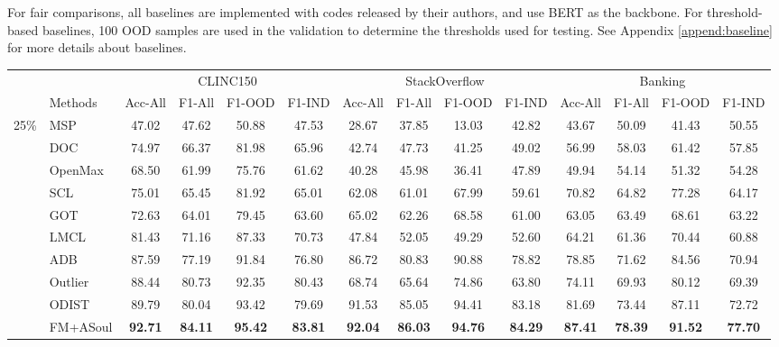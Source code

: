 \documentclass[11pt]{article}
\begin{document}
For fair comparisons, all baselines are implemented with codes released by their authors, and use BERT as the backbone. For threshold-based baselines, 100 OOD samples are used in the validation to determine the thresholds used for testing. See Appendix \ref{append:baseline} for more details about baselines.

\begin{table}[t]
\small
\setlength\tabcolsep{2pt} %
\begin{tabular}{cl|cccc|cccc|cccc}
\toprule
\multirow{2}{*}{}  &  &\multicolumn{4}{c|}{CLINC150}  &  \multicolumn{4}{c|}{StackOverflow}  &\multicolumn{4}{c}{Banking} \\
& Methods  & Acc-All & F1-All & F1-OOD & F1-IND &  Acc-All &   F1-All & F1-OOD & F1-IND & Acc-All &  F1-All & F1-OOD & F1-IND\\
\midrule
\multirow{10}{*}{25\%} 
    & MSP     & 47.02      & 47.62  & 50.88 & 47.53    & 28.67      & 37.85   & 13.03 & 42.82   & 43.67      & 50.09  & 41.43 & 50.55    \\
    & DOC     & 74.97      & 66.37  & 81.98 & 65.96   & 42.74      & 47.73  & 41.25 & 49.02    & 56.99      & 58.03   & 61.42 & 57.85   \\
    & OpenMax & 68.50      & 61.99  & 75.76 & 61.62    & 40.28      & 45.98  & 36.41 & 47.89    & 49.94      & 54.14    & 51.32 & 54.28  \\
    & SCL     & 75.01      & 65.45  & 81.92 & 65.01    & 62.08      & 61.01  & 67.99 & 59.61    & 70.82      & 64.82   & 77.28 & 64.17   \\
    & GOT     & 72.63      & 64.01  & 79.45 & 63.60   & 65.02      & 62.26   & 68.58 & 61.00   & 63.05      & 63.49    & 68.61 & 63.22  \\
    & LMCL    & 81.43      & 71.16  & 87.33 & 70.73    & 47.84      & 52.05  & 49.29 & 52.60    & 64.21      & 61.36  & 70.44 & 60.88    \\
    & ADB     & 87.59      & 77.19  & 91.84 & 76.80    & 86.72      & 80.83  & 90.88 & 78.82    & 78.85      & 71.62  & 84.56 & 70.94    \\
    & Outlier & 88.44      & 80.73  & 92.35 & 80.43    & 68.74      & 65.64  & 74.86 & 63.80    & 74.11      & 69.93   & 80.12 & 69.39    \\
    & ODIST   & 89.79      & 80.04  & 93.42 & 79.69   & 91.53      & 85.05   & 94.41 & 83.18   & 81.69      & 73.44   & 87.11 & 72.72   \\
\cmidrule{2-14}
    & FM+ASoul & \textbf{92.71} & \textbf{84.11} & \textbf{95.42} & \textbf{83.81} & \textbf{92.04}          & \textbf{86.03}   & \textbf{94.76} & \textbf{84.29}         & \textbf{87.41} & \textbf{78.39}     & \textbf{91.52} & \textbf{77.70}     \\

\end{tabular}
\end{table}
\end{document}
